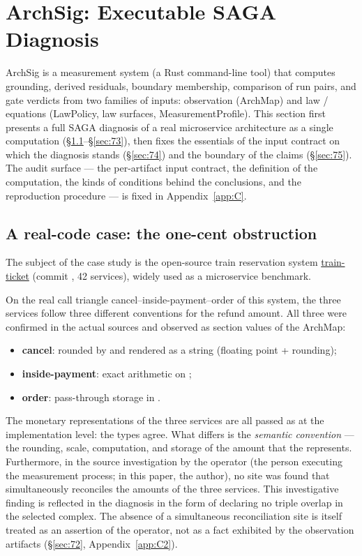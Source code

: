 \section{ArchSig: Executable SAGA Diagnosis}\label{sec:7}

ArchSig is a measurement system (a Rust command-line tool) that
computes grounding, derived residuals, boundary membership, comparison
of run pairs, and gate verdicts from two families of inputs:
observation (ArchMap) and law / equations (LawPolicy, law surfaces,
MeasurementProfile). This section first presents a full SAGA diagnosis
of a real microservice architecture as a single computation
(\S\ref{sec:71}--\S\ref{sec:73}), then fixes the essentials of the
input contract on which the diagnosis stands (\S\ref{sec:74}) and the
boundary of the claims (\S\ref{sec:75}). The audit surface --- the
per-artifact input contract, the definition of the computation, the
kinds of conditions behind the conclusions, and the reproduction procedure ---
is fixed in
Appendix~\ref{app:C}.

\subsection{A real-code case: the one-cent obstruction}\label{sec:71}

The subject of the case study is the open-source train reservation
system
\href{https://github.com/FudanSELab/train-ticket}{train-ticket}
(commit , 42 services), widely used as a
microservice benchmark.

On the real call triangle cancel--inside-payment--order of this
system, the three services follow three different conventions for the
refund amount. All three were confirmed in the actual sources and observed as
section values of the ArchMap:
{\sloppy
\begin{itemize}
\item \textbf{cancel}: \allowbreak{}
rounded by  and rendered as a string
(floating point + rounding);
\item \textbf{inside-payment}: exact arithmetic on
;
\item \textbf{order}: pass-through storage in
.
\end{itemize}
}

The monetary representations of the three services are all passed as
 at the implementation level: the types agree. What
differs is the \emph{semantic convention} --- the rounding, scale,
computation, and storage of the amount that the 
represents. Furthermore, in the source investigation by the operator
(the person executing the measurement process; in this paper, the
author), no site was found that simultaneously reconciles the amounts
of the three services. This investigative finding is reflected in the
diagnosis in the form of declaring no triple overlap in the selected
complex. The absence of a simultaneous reconciliation site is itself
treated as an assertion of the operator, not as a fact exhibited by the
observation artifacts (\S\ref{sec:72}, Appendix~\ref{app:C2}).

